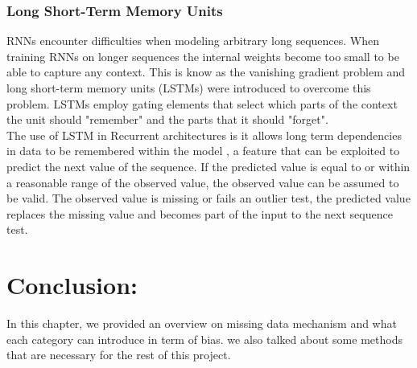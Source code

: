 \subsubsection{Long Short-Term Memory Units}
RNNs encounter difficulties when modeling arbitrary long sequences. When training RNNs on longer sequences the internal weights become too small to be able to capture any context. This is know as the vanishing gradient problem and long short-term memory units (LSTMs) were introduced to overcome this problem\cite{DBLP:journals/corr/Lipton15}. LSTMs employ gating elements that select which parts of the context the unit should "remember" and the parts that it should "forget"\cite{LSTM}.\\The use of LSTM in Recurrent architectures is it allows long term dependencies in data to be remembered within the model \cite{Graves2013a}, a feature that can be exploited to predict the next value of the sequence. If the predicted value is equal to or within a reasonable range of the observed value, the observed value can be assumed to be valid. The observed value is missing or fails an outlier test, the predicted value replaces the missing value and becomes part of the input to the next sequence test.

\section{Conclusion:}
In this chapter, we provided an overview on missing data mechanism and what each category can introduce in term of bias. we also talked about some methods that are necessary for the rest of this project.